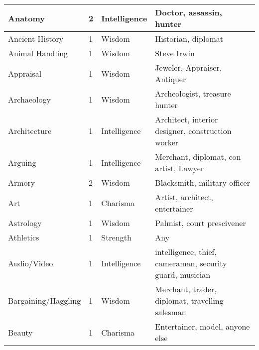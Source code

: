 \documentclass[twoside]{book}
\begin{document}
\begin{longtable}{p{1.25in}llp{12em}}
  \raggedright
           Anatomy 
  &
   2 
  &
   Intelligence 
  &
   Doctor, assassin, hunter
           
  \tabularnewline
  \hline
      
  \raggedright
           Ancient History 
  &
   1 
  &
   Wisdom 
  &
   Historian, diplomat
           
  \tabularnewline
  \hline
      
  \raggedright
           Animal Handling 
  &
   1 
  &
   Wisdom 
  &
   Steve Irwin 
  \tabularnewline
  \hline
      
  \raggedright
           Appraisal 
  &
   1 
  &
   Wisdom 
  &
   Jeweler, Appraiser,
           Antiquer 
  \tabularnewline
  \hline
      
  \raggedright
           Archaeology 
  &
   1 
  &
   Wisdom 
  &
   Archeologist, treasure
           hunter 
  \tabularnewline
  \hline
      
  \raggedright
           Architecture 
  &
   1 
  &
   Intelligence 
  &
   Architect, interior
           designer, construction worker 
  \tabularnewline
  \hline
      
  \raggedright
           Arguing 
  &
   1 
  &
   Intelligence 
  &
   Merchant, diplomat, con
           artist, Lawyer 
  \tabularnewline
  \hline
      
  \raggedright
           Armory 
  &
   2 
  &
   Wisdom 
  &
   Blacksmith, military
           officer 
  \tabularnewline
  \hline
      
  \raggedright
           Art 
  &
   1 
  &
   Charisma 
  &
   Artist, architect,
           entertainer 
  \tabularnewline
  \hline
      
  \raggedright
           Astrology 
  &
   1 
  &
   Wisdom 
  &
   Palmist, court
           prescivener 
  \tabularnewline
  \hline
      
  \raggedright
           Athletics 
  &
   1 
  &
   Strength 
  &
   Any 
  \tabularnewline
  \hline
      
  \raggedright
           Audio/Video 
  &
   1 
  &
   Intelligence 
  &
   intelligence, thief,
           cameraman, security guard, musician 
  \tabularnewline
  \hline
      
  \raggedright
           Bargaining/Haggling 
  &
   1 
  &
   Wisdom 
  &
   Merchant, trader,
           diplomat, travelling salesman 
  \tabularnewline
  \hline
      
  \raggedright
           Beauty 
  &
   1 
  &
   Charisma 
  &
   Entertainer, model,
           anyone else 
  \tabularnewline
  \hline
      

\end{longtable}
\end{document}
